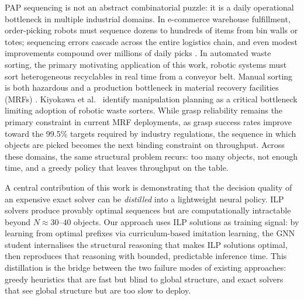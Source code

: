 \documentclass[conference]{IEEEtran}
\begin{document}
PAP sequencing is not an abstract combinatorial puzzle: it is a daily operational bottleneck in multiple industrial domains. In e-commerce warehouse fulfillment, order-picking robots must sequence dozens to hundreds of items from bin walls or totes; sequencing errors cascade across the entire logistics chain, and even modest improvements compound over millions of daily picks \cite{cheng2024drl}. In automated waste sorting, the primary motivating application of this work, robotic systems must sort heterogeneous recyclables in real time from a conveyor belt. Manual sorting is both hazardous and a production bottleneck in material recovery facilities (MRFs) \cite{gundupalli2020sequence}. Kiyokawa et al.\ \cite{kiyokawa2024challenges} identify manipulation planning as a critical bottleneck limiting adoption of robotic waste sorters. While grasp reliability remains the primary constraint in current MRF deployments, as grasp success rates improve toward the 99.5\% targets required by industry regulations, the sequence in which objects are picked becomes the next binding constraint on throughput. Across these domains, the same structural problem recurs: too many objects, not enough time, and a greedy policy that leaves throughput on the table.

A central contribution of this work is demonstrating that the decision quality of an expensive exact solver can be \emph{distilled} into a lightweight neural policy. ILP solvers produce provably optimal sequences but are computationally intractable beyond $N \approx 30$--$40$ objects. Our approach uses ILP solutions as training signal: by learning from optimal prefixes via curriculum-based imitation learning, the GNN student internalises the structural reasoning that makes ILP solutions optimal, then reproduces that reasoning with bounded, predictable inference time. This distillation is the bridge between the two failure modes of existing approaches: greedy heuristics that are fast but blind to global structure, and exact solvers that see global structure but are too slow to deploy.
\end{document}
